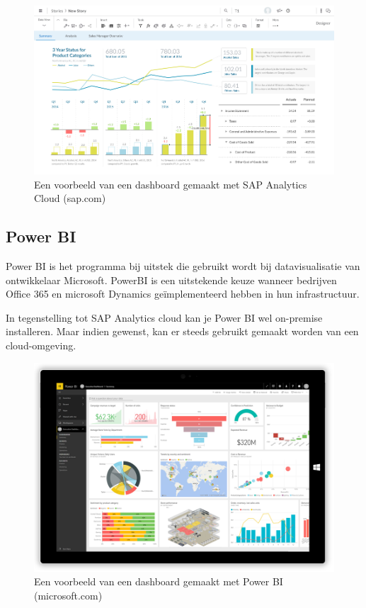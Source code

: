 \begin{figure}[h]
	\centering
	\includegraphics[scale=0.45]{../images/sac.png}
	\caption{Een voorbeeld van een dashboard gemaakt met SAP Analytics Cloud (sap.com)}
	\label{fig:sac}
\end{figure}

\subsection{Power BI}
Power BI is het programma bij uitstek die gebruikt wordt bij datavisualisatie van ontwikkelaar Microsoft. PowerBI is een uitstekende keuze wanneer bedrijven Office 365 en microsoft Dynamics geïmplementeerd hebben in hun infrastructuur.

In tegenstelling tot SAP Analytics cloud kan je Power BI wel on-premise installeren. Maar indien gewenst, kan er steeds gebruikt gemaakt worden van een cloud-omgeving.

\begin{figure}[h]
	\centering
	\includegraphics[scale=0.45]{../images/powerbi.png}
	\caption{Een voorbeeld van een dashboard gemaakt met Power BI (microsoft.com)}
	\label{fig:powerbi}
\end{figure}

